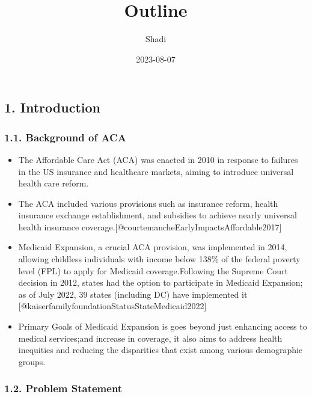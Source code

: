 \documentclass[
]{article}
\title{Outline}
\author{Shadi}
\date{2023-08-07}
\providecommand{\tightlist}{%
  \setlength{\itemsep}{0pt}\setlength{\parskip}{0pt}}
\begin{document}
\maketitle

\hypertarget{introduction}{%
\subsection{1. Introduction}\label{introduction}}

\hypertarget{background-of-aca}{%
\subsubsection{1.1. Background of ACA}\label{background-of-aca}}

\begin{itemize}
\tightlist
\item
  The Affordable Care Act (ACA) was enacted in 2010 in response to
  failures in the US insurance and healthcare markets, aiming to
  introduce universal health care reform.
\item
  The ACA included various provisions such as insurance reform, health
  insurance exchange establishment, and subsidies to achieve nearly
  universal health insurance
  coverage.{[}@courtemancheEarlyImpactsAffordable2017{]}
\item
  Medicaid Expansion, a crucial ACA provision, was implemented in 2014,
  allowing childless individuals with income below 138\% of the federal
  poverty level (FPL) to apply for Medicaid coverage.Following the
  Supreme Court decision in 2012, states had the option to participate
  in Medicaid Expansion; as of July 2022, 39 states (including DC) have
  implemented it {[}@kaiserfamilyfoundationStatusStateMedicaid2022{]}
\item
  Primary Goals of Medicaid Expansion is goes beyond just enhancing
  access to medical services;and increase in coverage, it also aims to
  address health inequities and reducing the disparities that exist
  among various demographic groups.
\end{itemize}

\hypertarget{problem-statement}{%
\subsubsection{1.2. Problem Statement}\label{problem-statement}}
\end{document}
